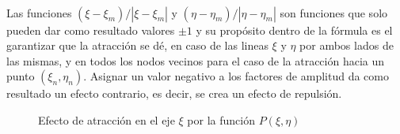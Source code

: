 \documentclass[letterpaper, openright, 12pt]{book}
\begin{document}
			\paragraph*{}
				Las funciones $(\xi - \xi_{m}) / |\xi - \xi_{m}|$ y $(\eta - \eta_{m}) / |\eta - \eta_{m}|$ son funciones que solo pueden dar como resultado valores $\pm 1$ y su propósito dentro de la fórmula es el garantizar que la atracción se dé, en caso de las lineas $\xi$ y $\eta$ por ambos lados de las mismas, y en todos los nodos vecinos para el caso de la atracción hacia un punto $(\xi_{n}, \eta_{n})$. Asignar un valor negativo a los factores de amplitud da como resultado un efecto contrario, es decir, se crea un efecto de repulsión.
				\begin{figure}[htbp!]
					\centering
					\hspace{1cm}
					\caption[Efecto de atracción por función $P(\xi,\eta)$]{Efecto de atracción en el eje $\xi$ por la función $P(\xi, \eta)$}
					\label{fig:densidad-xi}
				\end{figure}
			
\end{document}
